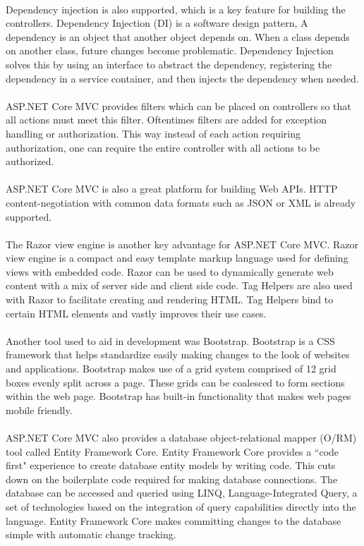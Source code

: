 \\ 
Dependency injection is also supported, which is a key feature for building the controllers. Dependency Injection (DI) is a software design pattern,  A dependency is an object that another object depends on. When a class depends on another class, future changes become problematic. Dependency Injection solves this by using an interface to abstract the dependency, registering the dependency in a service container, and then injects the dependency when needed.\\
\\
ASP.NET Core MVC provides filters which can be placed on controllers so that all actions must meet this filter. Oftentimes filters are added for exception handling or authorization. This way instead of each action requiring authorization, one can require the entire controller with all actions to be authorized. \\
\\
ASP.NET Core MVC is also a great platform for building Web APIs. HTTP content-negotiation with common data formats such as JSON or XML is already supported. \\
\\
The Razor view engine is another key advantage for ASP.NET Core MVC. Razor view engine is a compact and easy template markup language used for defining views with embedded \C code. Razor can be used to dynamically generate web content with a mix of server side and client side code. Tag Helpers are also used with Razor to facilitate creating and rendering HTML. Tag Helpers bind to certain HTML elements and vastly improves their use cases.\\
\\
Another tool used to aid in development was Bootstrap. Bootstrap is a CSS framework that helps standardize easily making changes to the look of websites and applications. Bootstrap makes use of a grid system comprised of 12 grid boxes evenly split across a page. These grids can be coalesced to form sections within the web page. Bootstrap has built-in functionality that makes web pages mobile friendly.\\
\\
ASP.NET Core MVC also provides a database object-relational mapper (O/RM) tool called Entity Framework Core. Entity Framework Core provides a ``code first" experience to create database entity models by writing code. This cuts down on the boilerplate code required for making database connections. The database can be accessed and queried using LINQ, Language-Integrated Query, a set of technologies based on the integration of query capabilities directly into the \C language. Entity Framework Core makes committing changes to the database simple with automatic change tracking.

